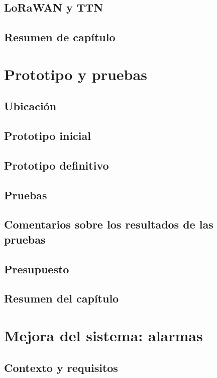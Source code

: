 \documentclass[12pt]{article}
\begin{document}
	\subsection[LoRaWAN y TTN]{LoRaWAN y TTN}
	\subsection[Resumen del capítulo]{Resumen de capítulo}
	
	\pagebreak
	
	\section[Prototipo y pruebas]{Prototipo y pruebas}
	\subsection[Ubicación]{Ubicación}
	\subsection[Prototipo inicial]{Prototipo inicial}
	\subsection[Prototipo definitivo]{Prototipo definitivo}
	\subsection[Pruebas]{Pruebas}
	\subsection[Comentarios sobre los resultados de las pruebas]{Comentarios sobre los resultados de las pruebas}
	\subsection[Presupuesto]{Presupuesto}
	\subsection[Resumen del capítulo]{Resumen del capítulo}
	
	\section[Mejora del sistema: alarmas]{Mejora del sistema: alarmas}
	\subsection[Contexto y requisitos]{Contexto y requisitos}
\end{document}
